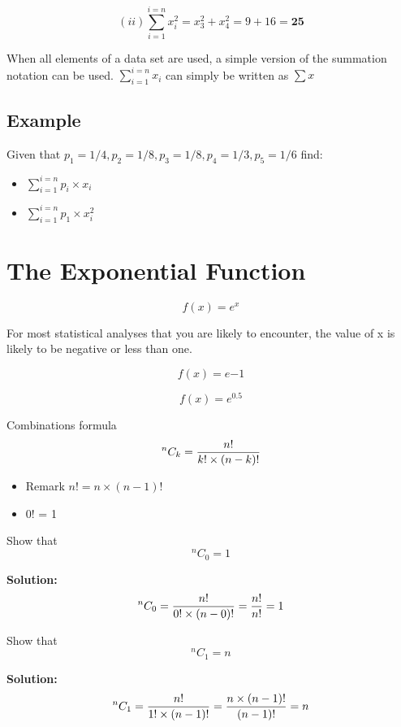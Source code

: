 \documentclass[]{report}
\begin{document}
{\[ (ii) \displaystyle\sum_{i=1}^{i=n} x_{i}^2 = x_3^2 + x_4^2  = 9 + 16 = \textbf{25} \]

\noindent When all elements of a data set are used, a simple version of the summation notation can be used.
$\displaystyle\sum_{i=1}^{i=n} x_{i}$  can simply be written as $\sum x$




\subsection*{Example}
Given that $p_1= 1/4, p_2= 1/8, p_3= 1/8,p_4= 1/3, p_5 = 1/6$ find:

\begin{itemize}
	\item $\displaystyle\sum_{i=1}^{i=n} p_{i} \times x_{i}$
	\item $\displaystyle\sum_{i=1}^{i=n} p_{1} \times x_{i}^2$
\end{itemize}




\section{The Exponential Function }

\[ f(x) = e^{x} \]

For most statistical analyses that you are likely to encounter, the value of x is likely to be negative or less than one.

\[ f(x) = e{-1} \]

\[ f(x) = e^{0.5} \]


\newpage

\begin{framed}
	{
		\large
Combinations formula
\[ ^{n}C_k  = {n! \over k!  \times (n-k)!} \]

\begin{itemize}
	\item Remark $n! = n \times (n-1)! $
	\item 0! = 1
\end{itemize}

\medskip
Show that
\[ ^{n}C_0  = 1 \]

\textbf{Solution: }
\[ ^{n}C_0  = {n! \over 0!  \times (n-0)!} =  {n! \over n!} = 1 \]


Show that
\[ ^{n}C_1  = n \]

\textbf{Solution: }
\[ ^{n}C_1  = {n! \over 1!  \times (n-1)!} =  {n \times (n-1)! \over (n-1)!} = n \]

\bigskip

}
\end{framed}}
\end{document}
